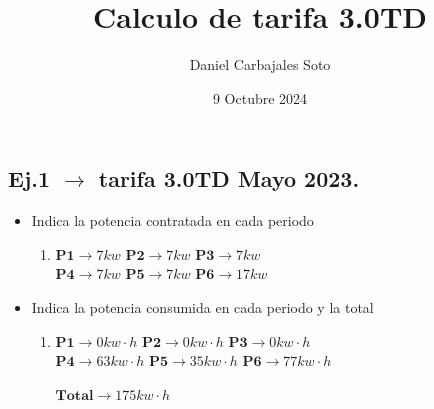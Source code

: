 \documentclass[13pt]{article}
\author{Daniel Carbajales Soto}
\title{Calculo de tarifa 3.0TD}
\date{9 Octubre 2024}
\begin{document}
\maketitle


\begin{flushleft}
\section{Ej.1 $\to$ tarifa 3.0TD Mayo 2023.}
\begin{itemize}
  
  \item Indica la potencia contratada en cada periodo 
  \begin{enumerate}
    \item\begin{flushleft}
      \(\mathbf{P1}\to 7kw\) \hfill \(\mathbf{P2}\to 7kw\) \hfill \(\mathbf{P3}\to 7kw\) \hfill  
      \\  
      \(\mathbf{P4}\to 7kw\) \hfill \(\mathbf{P5}\to 7kw\) \hfill \(\mathbf{P6}\to 17kw\)
    \end{flushleft}
\end{enumerate}

  \item Indica la potencia  consumida en cada periodo y la total
    \begin{enumerate}
    \item\begin{flushleft}
      \(\mathbf{P1}\to 0kw\cdot h\) \hfill \(\mathbf{P2}\to 0kw\cdot h\) \hfill \(\mathbf{P3}\to 0kw\cdot h\) \hfill  
      \\  
      \(\mathbf{P4}\to 63kw\cdot h\) \hfill \(\mathbf{P5}\to 35kw\cdot h\) \hfill \(\mathbf{P6}\to 77kw\cdot h\)
      \\
      \begin{flushright}
        \(\mathbf{Total}\to 175kw\cdot h\)
      \end{flushright}
    \end{flushleft}
\end{enumerate}
\end{itemize}

\end{flushleft}
\end{document}
